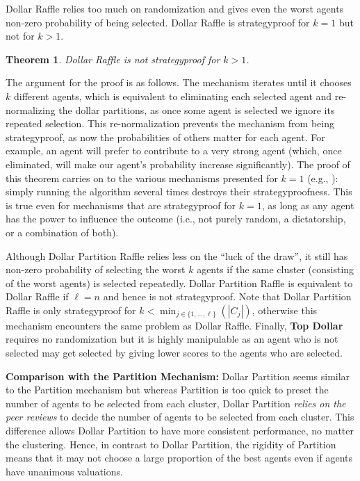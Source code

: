 \documentclass[letterpaper]{article}
\newtheorem{theorem}{Theorem}
\newcommand{\qed}{\unskip\hspace*{1em}\hspace{\fill}$\Box$}
\newenvironment{proof}[1][Proof]{\begin{trivlist}
 \item[\hskip \labelsep {\it #1:}]}{%
 \qed\end{trivlist}}
\begin{document}
Dollar Raffle relies too much on randomization and gives even the worst agents non-zero probability of being selected. Dollar Raffle is strategyproof for $k=1$ but not for $k>1$.

\begin{theorem}
	Dollar Raffle is not strategyproof for $k>1$.
\end{theorem}
The argument for the proof is as follows. The mechanism iterates until it chooses $k$ different agents, which is equivalent to eliminating each selected agent and re-normalizing the dollar partitions, as once some agent is selected we ignore its repeated selection. This re-normalization prevents the mechanism from being strategyproof, as now the probabilities of others matter for each agent. For example, an agent will prefer to contribute to a very strong agent (which, once eliminated, will make our agent's probability increase significantly).
The proof of this theorem carries on to the various mechanisms presented for $k=1$ (e.g., \cite{FeKl14a}): simply running the algorithm several times destroys their strategyproofness. This is true even for mechanisms that are strategyproof for $k=1$, as long as any agent has the power to influence the outcome (i.e., not purely random, a dictatorship, or a combination of both).

Although Dollar Partition Raffle relies less on the ``luck of the draw'', it still has non-zero probability of selecting the worst $k$ agents if the same cluster (consisting of the worst agents) is selected repeatedly. %
Dollar Partition Raffle is equivalent to Dollar Raffle if $\ell=n$ and hence is not strategyproof. Note that Dollar Partition Raffle is only strategyproof for $k<\min_{j\in \{1, \ldots, \ell\}}(|C_{j}|)$, otherwise this mechanism encounters the same problem as Dollar Raffle.
Finally, \textbf{Top Dollar} requires no randomization but it is highly manipulable as an agent who is not selected may get selected by giving lower scores to the agents who are selected.

\smallskip
\noindent
\textbf{Comparison with the Partition Mechanism:}
Dollar Partition seems similar to the Partition mechanism but whereas Partition is too quick to preset the number of agents to be selected from each cluster, Dollar Partition \emph{relies on the peer reviews} to decide the number of agents to be selected from each cluster. This difference allows Dollar Partition to have more consistent performance, no matter the clustering. Hence, in contrast to Dollar Partition, the rigidity of Partition means that it may not choose a large proportion of the best agents even if agents have unanimous valuations.
\end{document}
